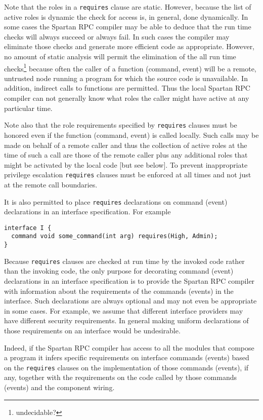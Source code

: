 Note that the roles in a \texttt{requires} clause are static. However, because the list of
active roles is dynamic the check for access is, in general, done dynamically. In some cases the
Spartan RPC compiler may be able to deduce that the run time checks will always succeed or
always fail. In such cases the compiler may eliminate those checks and generate more efficient
code as appropriate. However, no amount of static analysis will permit the elimination of the
all run time checks\footnote{undecidable?} because often the caller of a function (command,
event) will be a remote, untrusted node running a program for which the source code is
unavailable. In addition, indirect calls to functions are permitted. Thus the local Spartan RPC
compiler can not generally know what roles the caller might have active at any particular time.

Note also that the role requirements specified by \texttt{requires} clauses must be honored even
if the function (command, event) is called locally. Such calls may be made on behalf of a remote
caller and thus the collection of active roles at the time of such a call are those of the
remote caller plus any additional roles that might be activated by the local code [but see
below]. To prevent inappropriate privilege escalation \texttt{requires} clauses must be enforced
at all times and not just at the remote call boundaries.


It is also permitted to place \texttt{requires} declarations on command (event) declarations
in an interface specification. For example
\begin{verbatim}
interface I {
  command void some_command(int arg) requires(High, Admin); 
}
\end{verbatim}

Because \texttt{requires} clauses are checked at run time by the invoked code rather than the
invoking code, the only purpose for decorating command (event) declarations in an interface
specification is to provide the Spartan RPC compiler with information about the requirements of
the commands (events) in the interface. Such declarations are always optional and may not even
be appropriate in some cases. For example, we assume that different interface providers may have
different security requirements. In general making uniform declarations of those requirements on
an interface would be undesirable.

Indeed, if the Spartan RPC compiler has access to all the modules that compose a program it
infers specific requirements on interface commands (events) based on the \texttt{requires}
clauses on the implementation of those commands (events), if any, together with the requirements
on the code called by those commands (events) and the component wiring.

